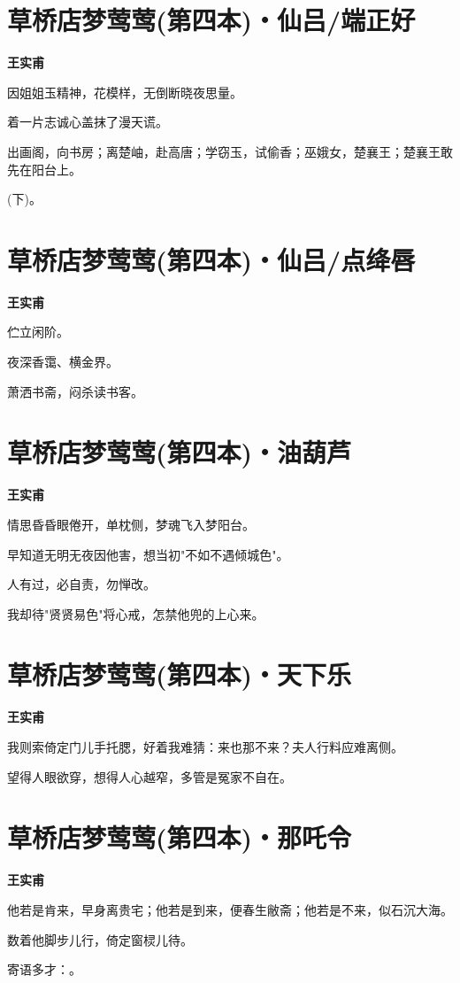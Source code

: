 \documentclass[12pt,a4paper]{ctexbook}
\begin{document}
\section{草桥店梦莺莺(第四本)・仙吕/端正好}
\textbf{王实甫}\par\vspace{0.5em}
因姐姐玉精神，花模样，无倒断晓夜思量。\par
着一片志诚心盖抹了漫天谎。\par
出画阁，向书房；离楚岫，赴高唐；学窃玉，试偷香；巫娥女，楚襄王；楚襄王敢先在阳台上。\par
(下)。\par

\section{草桥店梦莺莺(第四本)・仙吕/点绛唇}
\textbf{王实甫}\par\vspace{0.5em}
伫立闲阶。\par
夜深香霭、横金界。\par
萧洒书斋，闷杀读书客。\par

\section{草桥店梦莺莺(第四本)・油葫芦}
\textbf{王实甫}\par\vspace{0.5em}
情思昏昏眼倦开，单枕侧，梦魂飞入梦阳台。\par
早知道无明无夜因他害，想当初"不如不遇倾城色"。\par
人有过，必自责，勿惮改。\par
我却待"贤贤易色"将心戒，怎禁他兜的上心来。\par

\section{草桥店梦莺莺(第四本)・天下乐}
\textbf{王实甫}\par\vspace{0.5em}
我则索倚定门儿手托腮，好着我难猜：来也那不来？夫人行料应难离侧。\par
望得人眼欲穿，想得人心越窄，多管是冤家不自在。\par

\section{草桥店梦莺莺(第四本)・那吒令}
\textbf{王实甫}\par\vspace{0.5em}
他若是肯来，早身离贵宅；他若是到来，便春生敝斋；他若是不来，似石沉大海。\par
数着他脚步儿行，倚定窗棂儿待。\par
寄语多才：。\par
\end{document}
